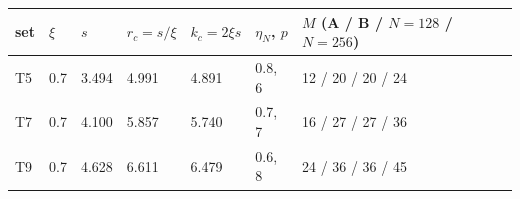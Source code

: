 \begin{tabular}{lllllll}
\toprule
set & $\xi$ & $s$ & $r_c=s/\xi$ & $k_c=2\xi s$ & $\eta_N$, $p$ & $M$ (A / B / $N\!=\!128$ / $N\!=\!256$) \\
\midrule
T5 & 0.7 & 3.494 & 4.991 & 4.891 & 0.8, 6 & 12 / 20 / 20 / 24 \\
T7 & 0.7 & 4.100 & 5.857 & 5.740 & 0.7, 7 & 16 / 27 / 27 / 36 \\
T9 & 0.7 & 4.628 & 6.611 & 6.479 & 0.6, 8 & 24 / 36 / 36 / 45 \\
\bottomrule
\end{tabular}
